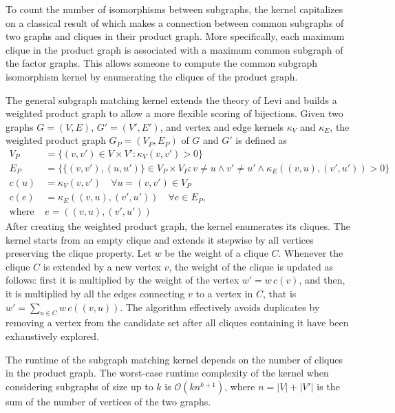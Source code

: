 \documentclass[twoside,11pt]{article}
\begin{document}
To count the number of isomorphisms between subgraphs, the kernel capitalizes on a classical result of  which makes a connection between common subgraphs of two graphs and cliques in their product graph.
More specifically, each maximum clique in the product graph is associated with a maximum common subgraph of the factor graphs.
This allows someone to compute the common subgraph isomorphism kernel by enumerating the cliques of the product graph.

The general subgraph matching kernel extends the theory of Levi and builds a weighted product graph to allow a more flexible scoring of bijections.
Given two graphs $G=(V,E)$, $G'=(V',E')$, and vertex and edge kernels $\kappa_V$ and $\kappa_E$, the weighted product graph $G_P=(V_P, E_P)$ of $G$ and $G'$ is defined as
\begin{equation}
    \begin{split}
        V_P &= \{ (v,v') \in V \times V' : \kappa_V(v,v') > 0 \} \\
        E_P &= \{ \{(v,v'),(u,u')\} \in V_P \times V_P : v \neq u \wedge v' \neq u' \wedge \kappa_E((v,u),(v',u')) > 0 \} \\
        c(u) &= \kappa_V(v,v') \quad \forall u=(v,v') \in V_P \\
        c(e) &= \kappa_E((v,u),(v',u')) \quad \forall e \in E_P, \\
        \text{where } &e=((v,u),(v',u')) 
    \end{split}
\end{equation}
After creating the weighted product graph, the kernel enumerates its cliques.
The kernel starts from an empty clique and extends it stepwise by all vertices preserving the clique property.
Let $w$ be the weight of a clique $C$.
Whenever the clique $C$ is extended by a new vertex $v$, the weight of the clique is updated as follows: first it is multiplied by the weight of the vertex $w' = w \, c(v)$, and then, it is multiplied by all the edges connecting $v$ to a vertex in $C$, that is $w' = \sum_{u \in C} w \, c((v,u))$.
The algorithm effectively avoids duplicates by removing a vertex from the candidate set after all cliques containing it have been exhaustively explored.

The runtime of the subgraph matching kernel depends on the number of cliques in the product graph.
The worst-case runtime complexity of the kernel when considering subgraphs of size up to $k$ is $\mathcal{O}(kn^{k+1})$, where $n=|V|+|V'|$ is the sum of the number of vertices of the two graphs.
\end{document}
